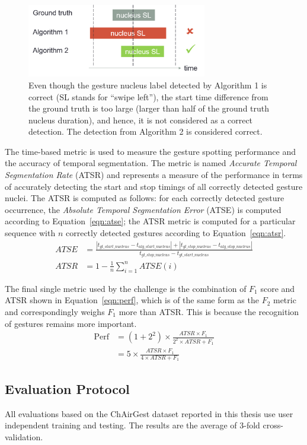 \begin{figure}[tbh]
\centering
\includegraphics[width=0.7\textwidth]{figures/true_positive.png}
\caption{Even though the gesture nucleus label detected by Algorithm 1 is
correct (SL stands for ``swipe left''), the start time difference from the
ground truth is too large (larger than half of the ground truth nucleus
duration), and hence, it is not considered as a correct detection. The detection
from Algorithm 2 is considered correct.}
\label{fig:true-positive}
\end{figure}

The time-based metric is used to measure the gesture spotting performance and
the accuracy of temporal segmentation. The metric is named \textit{Accurate
Temporal Segmentation Rate} (ATSR) and represents a measure of the performance
in terms of accurately detecting the start and stop timings of all correctly
detected gesture nuclei. The ATSR is computed as follows: for each correctly detected gesture
occurrence, the \textit{Absolute Temporal Segmentation Error} (ATSE) is computed
according to Equation~\ref{eqn:atse}; the ATSR metric is computed for a
particular sequence with $n$ correctly detected gestures according to
Equation~\ref{eqn:atsr}.
\begin{align}
ATSE &= \frac{|t_{gt\_start\_nucleus} - t_{alg\_start\_nucleus}| +
|t_{gt\_stop\_nucleus} - t_{alg\_stop\_nucleus}|}{t_{gt\_stop\_nucleus} -
t_{gt\_start\_nucleus}} \label{eqn:atse} \\
ATSR &= 1 - \frac{1}{n}\sum_{i=1}^nATSE(i)
\label{eqn:atsr}
\end{align}

The final single metric used by the challenge is the combination
of $F_1$ score and ATSR shown in Equation~\ref{eqn:perf}, which is of the same
form as the $F_2$ metric and correspondingly weighs $F_1$ more than ATSR. This
is because the recognition of gestures remains more important.
\begin{align}
\text{Perf} &= (1 + 2^2)\times \frac{ATSR\times F_1}{2^2\times ATSR +
F_1} \\
 &= 5\times \frac{ATSR\times F_1}{4\times ATSR + F_1}\label{eqn:perf}
\end{align}

\subsection{Evaluation Protocol}
All evaluations based on the ChAirGest dataset reported in this thesis use user
independent training and testing. The results are the average of 3-fold
cross-validation.
